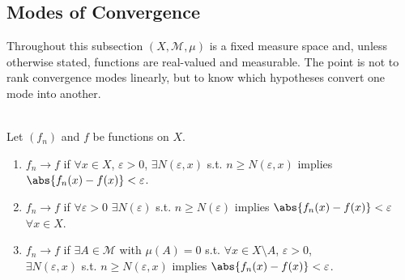 \subsection{Modes of Convergence}


Throughout this subsection $(X,\mathcal{M},\mu)$ is a fixed measure space and, unless otherwise stated, functions are real-valued and measurable. The point is not to rank convergence modes linearly, but to know which hypotheses convert one mode into another.

\begin{definition} \label{def:modes-pointwise-uniform-ae} \\
Let $(f_n)$ and $f$ be functions on $X$.
\begin{enumerate}[label=(\roman*)]
\setlength{\itemsep}{0pt}
\item $f_n\to f$  if $\forall x\in X$, $\varepsilon>0$, $\exists N(\varepsilon,x)$ s.t. $n\geq N(\varepsilon,x)$ implies $\abs{f_n(x)-f(x)}<\varepsilon$.
\item $f_n\to f$  if $\forall \varepsilon>0$ $\exists N(\varepsilon)$ s.t. $n\geq N(\varepsilon)$ implies $\abs{f_n(x)-f(x)}<\varepsilon$ $\forall x\in X$.
\item $f_n\to f$  if $\exists A\in\mathcal{M}$ with $\mu(A)=0$ s.t. $\forall x\in X\setminus A$, $\varepsilon>0$,\\
$\exists N(\varepsilon,x)$ s.t. $n\geq N(\varepsilon,x)$ implies $\abs{f_n(x)-f(x)}<\varepsilon$.
\end{enumerate}
\end{definition}

